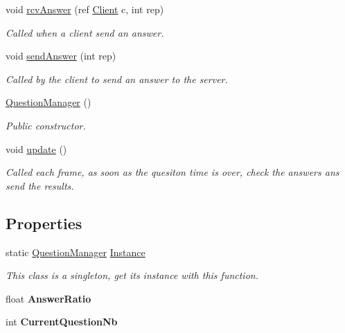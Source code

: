 \begin{DoxyCompactItemize}
void \hyperlink{class_question_manager_a9a9a2d06e109f932443fbdfa3968294e}{rcv\-Answer} (ref \hyperlink{class_client}{Client} c, int rep)
\begin{DoxyCompactList}\small\item\em Called when a client send an answer.\end{DoxyCompactList}\item 
void \hyperlink{class_question_manager_a788ad59986cf955cee459d199515e283}{send\-Answer} (int rep)
\begin{DoxyCompactList}\small\item\em Called by the client to send an answer to the server.\end{DoxyCompactList}\item 
\hyperlink{class_question_manager_abc78201457e6f5386990434f08d46672}{Question\-Manager} ()
\begin{DoxyCompactList}\small\item\em Public constructor.\end{DoxyCompactList}\item 
void \hyperlink{class_question_manager_aa87d5ffda73d08883db83555400a9987}{update} ()
\begin{DoxyCompactList}\small\item\em Called each frame, as soon as the quesiton time is over, check the answers ans send the results.\end{DoxyCompactList}\end{DoxyCompactItemize}
\subsection*{Properties}
\begin{DoxyCompactItemize}
\item 
static \hyperlink{class_question_manager}{Question\-Manager} \hyperlink{class_question_manager_a96dda0e2445bf92325df364298864be9}{Instance}
\begin{DoxyCompactList}\small\item\em This class is a singleton, get its instance with this function.\end{DoxyCompactList}\item 
\hypertarget{class_question_manager_a76ec948fc64a6311d594a86ed65ad2c2}{float {\bfseries Answer\-Ratio}}\label{class_question_manager_a76ec948fc64a6311d594a86ed65ad2c2}

\item 
\hypertarget{class_question_manager_a150f4e4d28c687240399a64611670e91}{int {\bfseries Current\-Question\-Nb}}\label{class_question_manager_a150f4e4d28c687240399a64611670e91}

\end{DoxyCompactItemize}


